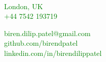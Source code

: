 \documentclass [
        11pt
] {article}
\begin{document}
\begin{multicols}{2}

\\
\noindent \textcolor{green}{London, UK}\\
\noindent \textcolor{green}{$+$44 7542 193719}\\

\columnbreak

\hspace*{\fill} \noindent \textcolor{green}{biren.dilip.patel@gmail.com}\\
\hspace*{\fill} \noindent \textcolor{green}{github.com/birendpatel}\\
\hspace*{\fill} \noindent \textcolor{green}{linkedin.com/in/birendilippatel}

\end{multicols}

\end{document}
